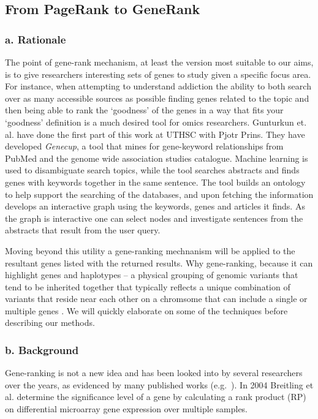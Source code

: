 \subsection{From PageRank to GeneRank}
\subsubsection*{a. Rationale}

The point of gene-rank mechanism, at least the version most suitable to our aims, is to give researchers interesting sets of genes to study given a specific focus area.
For instance, when attempting to understand addiction the ability to both search over as many accessible sources as possible finding genes related to the topic and then being able to rank the `goodness' of the genes in a way that fits your `goodness' definition is a much desired tool for omics researchers.
Gunturkun\cite{Gunturkun:2022} et. al. have done the first part of this work at UTHSC with Pjotr Prins. 
They have developed \textit{Genecup}, a tool that mines for gene-keyword relationships from PubMed and the genome wide association studies catalogue\cite{Buniello:2019}.
Machine learning is used to disambiguate search topics, while the tool searches abstracts and finds genes with keywords together in the same sentence.
The tool builds an ontology to help support the searching of the databases, and upon fetching the information develops an interactive graph using the keywords, genes and articles it finds.
As the graph is interactive one can select nodes and investigate sentences from the abstracts that result from the user query.

Moving beyond this utility a gene-ranking mechnanism will be applied to the resultant genes listed with the returned results.
Why gene-ranking, because it can highlight genes and haplotypes -- a physical grouping of genomic variants that tend to be inherited together that typically reflects a unique combination of variants that reside near each other on a chromsome that can include a single or multiple genes \cite{NHGRI:Haplotype}.
We will quickly elaborate on some of the techniques before describing our methods.

\subsubsection*{b. Background}
Gene-ranking is not a new idea and has been looked into by several researchers over the years, as evidenced by many published works (e.g.~\cite{hero2004pareto, breitling2004, morrison2005, agarwal2009ranking, wu2012ranking, re2012fast, xiao2014novel, bourdakou2016discovering, deandres2016sensitivity, Botia:2021, Panigrahi:2021}).
In 2004 Breitling et al.\cite{breitling2004} determine the significance level of a gene by calculating a rank product (RP) on differential microarray gene expression over multiple samples.

